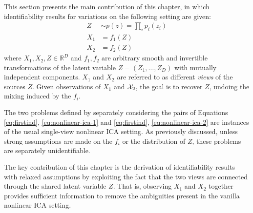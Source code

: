 This section presents the main contribution of this chapter, in which identifiability results for variations on the following setting are given:
\begin{align}
Z &\sim p(z) = \prod_{i} p_i(z_i) \label{eq:firstind}\\
X_1 &= f_1(Z) \label{eq:nonlinear-ica-1}\\
X_2 &= f_2(Z) \label{eq:nonlinear-ica-2}
\end{align}
where $X_1, X_2, Z \in \mathbb{R}^D$ and $f_1, f_2$ are arbitrary smooth and invertible transformations of the latent variable $Z = (Z_1, \ldots, Z_D)$ with mutually independent components.
$X_1$ and $X_2$ are referred to as different \emph{views} of the sources $Z$.
Given observations of $X_1$ and $\mathcal{X}_2$, the goal is to recover $Z$, undoing the mixing induced by the $f_i$.

The two problems defined by separately considering the pairs of Equations \ref{eq:firstind}, \ref{eq:nonlinear-ica-1} and \ref{eq:firstind}, \ref{eq:nonlinear-ica-2} are instances of the usual single-view nonlinear ICA setting.
As previously discussed, unless strong assumptions are made on the $f_i$ or the distribution of $Z$, these problems are separately unidentifiable. 

The key contribution of this chapter is 
the derivation of
identifiability results 
with relaxed assumptions by exploiting the fact that the 
two views are connected through the shared latent variable $Z$. 
That is, observing $X_1$ and $X_2$ together provides sufficient information to remove the ambiguities present in the vanilla nonlinear ICA setting.



